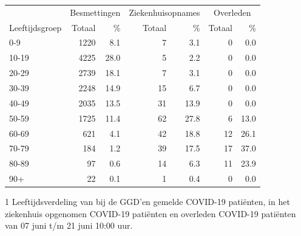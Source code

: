 \documentclass[
  english,
  man,floatsintext]{apa6}
\begin{document}
\begin{table}
\centering\begingroup\fontsize{11}{13}\selectfont

\begin{threeparttable}
\begin{tabular}{lrrrrrr}
\toprule
\multicolumn{1}{c}{ } & \multicolumn{2}{c}{Besmettingen} & \multicolumn{2}{c}{Ziekenhuisopnames} & \multicolumn{2}{c}{Overleden} \\
\cmidrule(l{3pt}r{3pt}){2-3} \cmidrule(l{3pt}r{3pt}){4-5} \cmidrule(l{3pt}r{3pt}){6-7}
Leeftijdsgroep & Totaal & \% & Totaal & \% & Totaal & \%\\
\midrule
0-9 & 1220 & 8.1 & 7 & 3.1 & 0 & 0.0\\
10-19 & 4225 & 28.0 & 5 & 2.2 & 0 & 0.0\\
20-29 & 2739 & 18.1 & 7 & 3.1 & 0 & 0.0\\
30-39 & 2248 & 14.9 & 15 & 6.7 & 0 & 0.0\\
40-49 & 2035 & 13.5 & 31 & 13.9 & 0 & 0.0\\
50-59 & 1725 & 11.4 & 62 & 27.8 & 6 & 13.0\\
60-69 & 621 & 4.1 & 42 & 18.8 & 12 & 26.1\\
70-79 & 184 & 1.2 & 39 & 17.5 & 17 & 37.0\\
80-89 & 97 & 0.6 & 14 & 6.3 & 11 & 23.9\\
90+ & 22 & 0.1 & 1 & 0.4 & 0 & 0.0\\
\bottomrule
\end{tabular}
\begin{tablenotes}
\item[1] Leeftijdsverdeling van bij de GGD’en gemelde COVID-19 patiënten, in het ziekenhuis opgenomen COVID-19 patiënten en overleden COVID-19 patiënten van 07 juni t/m 21 juni 10:00 uur.
\end{tablenotes}
\end{threeparttable}
\endgroup{}
\end{table}

\newpage
\end{document}
